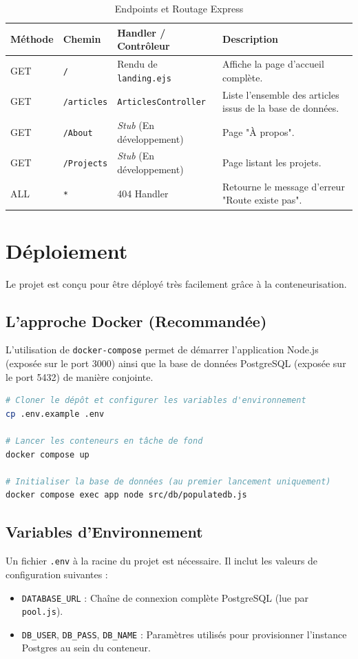 \documentclass[12pt,a4paper]{article}
\begin{document}
\begin{table}[h]
\centering
\begin{tabularx}{\textwidth}{|l|l|l|X|}
\hline
\textbf{Méthode} & \textbf{Chemin} & \textbf{Handler / Contrôleur} & \textbf{Description} \\ \hline
GET & \texttt{/} & Rendu de \texttt{landing.ejs} & Affiche la page d'accueil complète. \\ \hline
GET & \texttt{/articles} & \texttt{ArticlesController} & Liste l'ensemble des articles issus de la base de données. \\ \hline
GET & \texttt{/About} & \textit{Stub} (En développement) & Page "À propos". \\ \hline
GET & \texttt{/Projects} & \textit{Stub} (En développement) & Page listant les projets. \\ \hline
ALL & \texttt{*} & 404 Handler & Retourne le message d'erreur "Route existe pas". \\ \hline
\end{tabularx}
\caption{Endpoints et Routage Express}
\end{table}

\section{Déploiement}

Le projet est conçu pour être déployé très facilement grâce à la conteneurisation.

\subsection{L'approche Docker (Recommandée)}
L'utilisation de \texttt{docker-compose} permet de démarrer l'application Node.js (exposée sur le port 3000) ainsi que la base de données PostgreSQL (exposée sur le port 5432) de manière conjointe. 

\begin{lstlisting}[language=bash, title=Lancement via Docker]
# Cloner le dépôt et configurer les variables d'environnement
cp .env.example .env

# Lancer les conteneurs en tâche de fond
docker compose up

# Initialiser la base de données (au premier lancement uniquement)
docker compose exec app node src/db/populatedb.js
\end{lstlisting}

\subsection{Variables d'Environnement}
Un fichier \texttt{.env} à la racine du projet est nécessaire. Il inclut les valeurs de configuration suivantes :
\begin{itemize}
    \item \texttt{DATABASE\_URL} : Chaîne de connexion complète PostgreSQL (lue par \texttt{pool.js}).
    \item \texttt{DB\_USER}, \texttt{DB\_PASS}, \texttt{DB\_NAME} : Paramètres utilisés pour provisionner l'instance Postgres au sein du conteneur.
\end{itemize}
\end{document}

